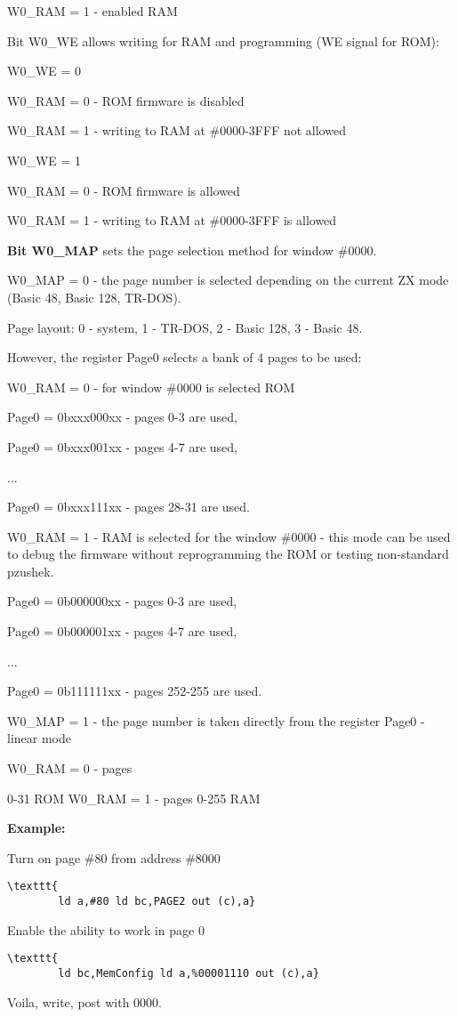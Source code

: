 W0\_RAM = 1 - enabled RAM 

Bit W0\_WE allows writing for RAM and programming (WE signal for ROM):

W0\_WE = 0 

W0\_RAM = 0 - ROM firmware is disabled

W0\_RAM = 1 - writing to RAM at \#0000-3FFF not allowed

W0\_WE = 1 

W0\_RAM = 0 - ROM firmware is allowed

W0\_RAM = 1 - writing to RAM at \#0000-3FFF is allowed

\textbf{Bit W0\_MAP} sets the page selection method for window \#0000.

 

W0\_MAP = 0 - the page number is selected depending on the current ZX
mode (Basic 48, Basic 128, TR-DOS).

Page layout: 0 - system, 1 - TR-DOS, 2 - Basic 128, 3 - Basic 48.

However, the register Page0 selects a bank of 4 pages to be used:

W0\_RAM = 0 - for window \#0000 is selected ROM

Page0 = 0bxxx000xx - pages 0-3 are used,

Page0 = 0bxxx001xx - pages 4-7 are used, 

... 

Page0 = 0bxxx111xx - pages 28-31 are used.

W0\_RAM = 1 - RAM is selected for the window \#0000 - this mode can be
used to debug the firmware without reprogramming the ROM or testing
non-standard pzushek.

Page0 = 0b000000xx - pages 0-3 are used, 

Page0 = 0b000001xx - pages 4-7 are used,

... 

Page0 = 0b111111xx - pages 252-255 are used.

W0\_MAP = 1 - the page number is taken directly from the register
Page0 - linear mode

W0\_RAM = 0 - pages

0-31 ROM W0\_RAM = 1 - pages 0-255 RAM

\textbf{Example:}

Turn on page \#80 from address \#8000
\begin{verbatim}\texttt{
		ld a,#80 ld bc,PAGE2 out (c),a}
\end{verbatim}
Enable the ability to work in page 0
\begin{verbatim}\texttt{
		ld bc,MemConfig ld a,%00001110 out (c),a}
\end{verbatim}
Voila, write, post with 0000.
